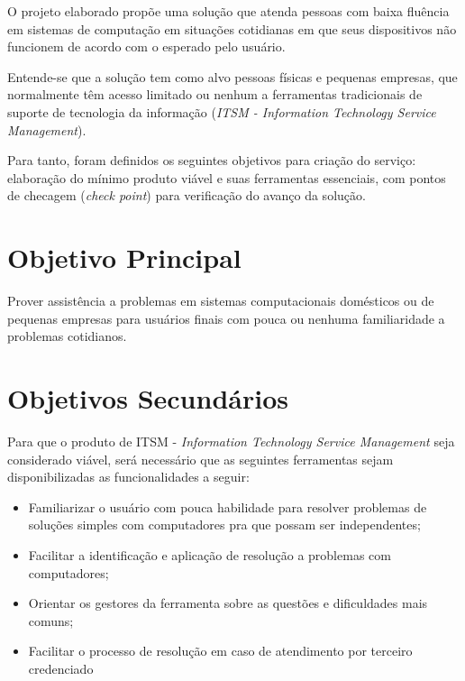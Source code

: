 \documentclass[
    12pt,               %
    openright,          %
    oneside,
    a4paper,            %
    MODELO,             %
    english,            %
    brazil              %
   ]{ifsp-spo-inf-ctds}
\begin{document}
	O projeto elaborado propõe uma solução que atenda pessoas com baixa fluência em sistemas de computação em situações cotidianas em que seus dispositivos não funcionem de acordo com o esperado pelo usuário.
	
	Entende-se que a solução tem como alvo pessoas físicas e pequenas empresas, que normalmente têm acesso limitado ou nenhum a ferramentas tradicionais de suporte de tecnologia da informação (\textit{ITSM - Information Technology Service Management}).
	
	Para tanto, foram definidos os seguintes objetivos para criação do serviço: elaboração do mínimo produto viável e suas ferramentas essenciais, com pontos de checagem (\textit{check point}) para verificação do avanço da solução.

\section{Objetivo Principal}

	Prover assistência a problemas em sistemas computacionais domésticos ou de pequenas empresas para usuários finais com pouca ou nenhuma familiaridade a problemas cotidianos.

\section{Objetivos Secundários}

	Para que o produto de ITSM - \textit{Information Technology Service Management} seja considerado viável, será necessário que as seguintes ferramentas sejam disponibilizadas as funcionalidades a seguir: 
	
	\begin{itemize}
		
		\item
		Familiarizar o usuário com pouca habilidade para resolver problemas de soluções simples com computadores pra que possam ser independentes;
		
		\item
		Facilitar a identificação e aplicação de resolução a problemas com computadores;
		
		\item
		Orientar os gestores da ferramenta sobre as questões e dificuldades mais comuns;
		
		\item 
		Facilitar o processo de resolução em caso de atendimento por terceiro credenciado
		 
	\end{itemize}
\end{document}
